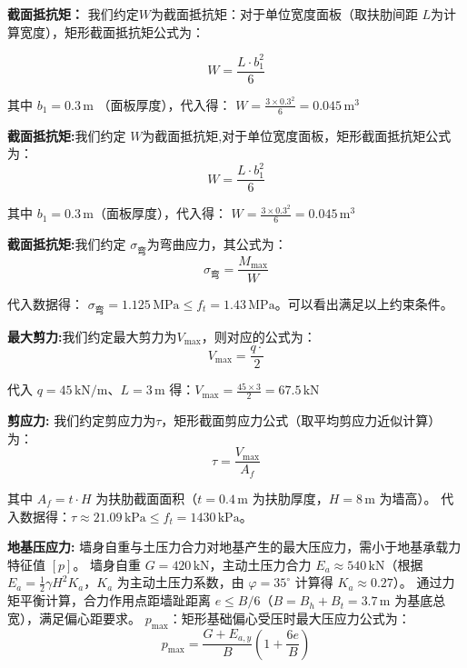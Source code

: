 \documentclass[withoutpreface,bwprint]{cumcmthesis}
\begin{document}
\textbf{截面抵抗矩：}
我们约定$W$为截面抵抗矩：对于单位宽度面板（取扶肋间距 $L$为计算宽度），矩形截面抵抗矩公式为：

    \begin{equation}
        W = \frac{L \cdot b_1^2}{6}
    \end{equation}

其中 $b_1 = 0.3 \, \text{m}$ （面板厚度），代入得：
$W = \frac{3 \times 0.3^2}{6} = 0.045 \, \text{m}^3$

\textbf{截面抵抗矩:}我们约定 $W$为截面抵抗矩,对于单位宽度面板，矩形截面抵抗矩公式为：
    \begin{equation}
        W = \frac{L\cdot b_1^2}{6}
    \end{equation}

其中 $b_1 = 0.3 \, \text{m}$（面板厚度），代入得：
$W = \frac{3 \times 0.3^2}{6} = 0.045 \, \text{m}^3$
\par

\textbf{截面抵抗矩:}我们约定 $\sigma_{\text{弯}}$为弯曲应力，其公式为：
    \begin{equation}
        \sigma_{\text{弯}} = \frac{M_{\text{max}}}{W}
    \end{equation}


代入数据得：
$\sigma_{\text{弯}} = 1.125 \, \text{MPa} \leq f_t = 1.43 \, \text{MPa} $。可以看出满足以上约束条件。


\textbf{最大剪力:}我们约定最大剪力为$V_{\text{max}}$，则对应的公式为：
    \begin{equation}
        V_{\text{max}} = \frac{q \cdot }{2}    
    \end{equation}


代入 $q = 45 \, \text{kN/m}$、$L = 3 \, \text{m}$ 得：$V_{\text{max}} = \frac{45 \times 3}{2} = 67.5 \, \text{kN} $
\par
\textbf{剪应力:} 我们约定剪应力为$\tau$，矩形截面剪应力公式（取平均剪应力近似计算）为：
    \begin{equation}
        \tau = \frac{V_{\text{max}}}{A_f}
    \end{equation}

其中 $A_f = t \cdot H$ 为扶肋截面面积（$t = 0.4 \, \text{m}$ 为扶肋厚度，$H = 8 \, \text{m}$ 为墙高）。  
代入数据得：$\tau \approx 21.09 \, \text{kPa} \leq f_t = 1430 \, \text{kPa} $。


\textbf{地基压应力:}
墙身自重与土压力合力对地基产生的最大压应力，需小于地基承载力特征值 $[p]$。
墙身自重 $G = 420 \, \text{kN}$，主动土压力合力 $E_a \approx 540 \, \text{kN}$（根据 $E_a = \frac{1}{2} \gamma H^2 K_a$，$K_a$ 为主动土压力系数，由 $\varphi = 35^\circ$ 计算得 $K_a \approx 0.27$）。
通过力矩平衡计算，合力作用点距墙趾距离 $e \leq B/6$（$B = B_h + B_t = 3.7 \, \text{m}$ 为基底总宽），满足偏心距要求。
$p_{\text{max}}$：矩形基础偏心受压时最大压应力公式为：
    \begin{equation}
        p_{\text{max}} = \frac{G + E_{a,y}}{B} \left(1 + \frac{6e}{B}\right)
    \end{equation}
\end{document}
